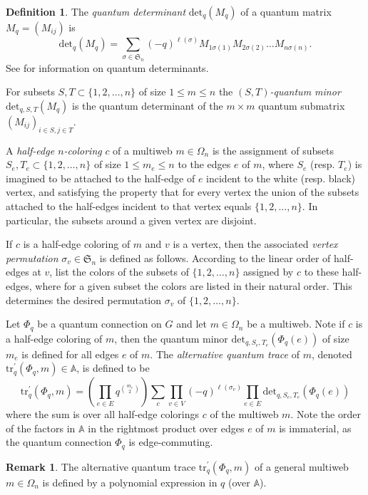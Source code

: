 \documentclass[12pt, reqno]{amsart}
\theoremstyle{definition}
\newtheorem{defi}[theo]{Definition}
\newtheorem{rema}[theo]{Remark}
\renewcommand{\det}{\mathrm{det}}%
\newcommand{\be}{\begin{equation}}
\newcommand{\ee}{\end{equation}}
\newcommand{\trqc}{\mathrm{tr}_q}%
\begin{document}
\begin{defi}\label{defi:qdeterminant}
The \emph{quantum determinant} $\det_q(M_q)$ of a quantum matrix $M_q=(M_{ij})$ is 
$$
\det_q(M_q)=\sum_{\sigma\in \mathfrak{S}_n}(-q)^{\ell(\sigma)}M_{1\sigma(1)}M_{2\sigma(2)}\dots M_{n\sigma(n)}.
$$
See \cite{parshall_wang} for information on quantum determinants.  

For subsets $S,T\subset\{1,2,\dots,n\}$ of size $1\leq m\leq n$ the \emph{$(S,T)$-quantum minor} $\det_{q,S,T}(M_q)$ is the quantum determinant of the $m\times m$ quantum submatrix $(M_{ij})_{i\in S,j\in T}$.  

A \emph{half-edge $n$-coloring} $c$ of a multiweb $m\in\Omega_n$ is the assignment of subsets $S_e, T_e\subset\{1,2,\dots,n\}$ of size $1\leq m_e\leq n$ to the edges $e$ of $m$, where $S_e$ (resp. $T_e$) is imagined to be attached to the half-edge of $e$ incident to the white (resp. black) vertex, and satisfying the property that for every vertex the union of the subsets attached to the half-edges incident to that vertex equals $\{1,2,\dots,n\}$.  In particular, the subsets around a given vertex are disjoint.  

If $c$ is a half-edge coloring of $m$ and $v$ is a vertex, then the associated \emph{vertex permutation} $\sigma_v\in \mathfrak{S}_n$ is defined as follows.  According to the linear order of half-edges at $v$, list the colors of the subsets of $\{1,2,\dots,n\}$ assigned by $c$ to these half-edges, where for a given subset the colors are listed in their natural order.  This determines the desired permutation $\sigma_v$ of $\{1,2,\dots,n\}$.   

Let $\Phi_q$ be a quantum connection on $G$ and let $m\in\Omega_n$ be a multiweb.  Note if $c$ is a half-edge coloring of $m$, then the quantum minor $\det_{q,S_e,T_e}(\Phi_q(e))$ of size $m_e$ is defined for all edges $e$ of $m$.  The \emph{alternative quantum trace} of $m$, denoted $\trqc^\prime(\Phi_q,m)\in\mathbb{A}$, is defined to be
\be\label{alttrace}
\trqc^\prime(\Phi_q,m)=\left(\prod_{e\in E}q^{\binom{m_e}{2}}\right)\sum_c\prod_{v\in V}(-q)^{\ell(\sigma_v)}\prod_{e\in E}\det_{q,S_e,T_e}(\Phi_q(e))  
\ee
where the sum is over all half-edge colorings $c$ of the multiweb $m$.  Note the order of the factors in $\mathbb{A}$ in the rightmost product over edges $e$ of $m$ is immaterial, as the quantum connection $\Phi_q$ is edge-commuting.  
\end{defi}

\begin{rema}\label{rema:alternativeqtraceispolynomial}
The alternative quantum trace $\trqc^\prime(\Phi_q,m)$ of a general multiweb $m\in\Omega_n$ is defined by a polynomial expression in $q$ (over $\mathbb{A}$).  
\end{rema}
\end{document}
